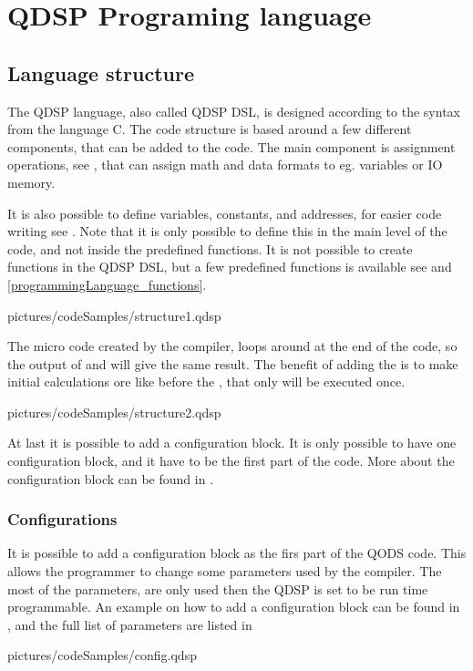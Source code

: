 \chapter{QDSP Programing language}

\section{Language structure}\label{programmingLanguage_structure}
The QDSP language, also called QDSP DSL, is designed according to the syntax from the language C. The code structure is based around a few different components, that can be added to the code. The main component is assignment operations, see , that can assign math and data formats to eg. variables or IO memory. 

It is also possible to define variables, constants, and addresses, for easier code writing see . Note that it is only possible to define this in the main level of the code, and not inside the predefined functions. It is not possible to create functions in the QDSP DSL, but a few predefined functions is available see  and \ref{programmingLanguage_functions}.


  {pictures/codeSamples/structure1.qdsp}
	
The micro code created by the compiler, loops around at the end of the code, so the output of  and  will give the same result. The benefit of adding the  is to make initial calculations ore like before the , that only will be executed once.
	

  {pictures/codeSamples/structure2.qdsp}

At last it is possible to add a configuration block. It is only possible to have one configuration block, and it have to be the first part of the code. More about the configuration block can be found in .

\subsection{Configurations}\label{programmingLanguage_configurations}
It is possible to add a configuration block as the firs part of the QODS code. This allows the programmer to change some parameters used by the compiler. The most of the parameters, are only used then the QDSP is set to be run time programmable. An example on how to add a configuration block can be found in , and the full list of parameters are listed in 

  {pictures/codeSamples/config.qdsp}
	

